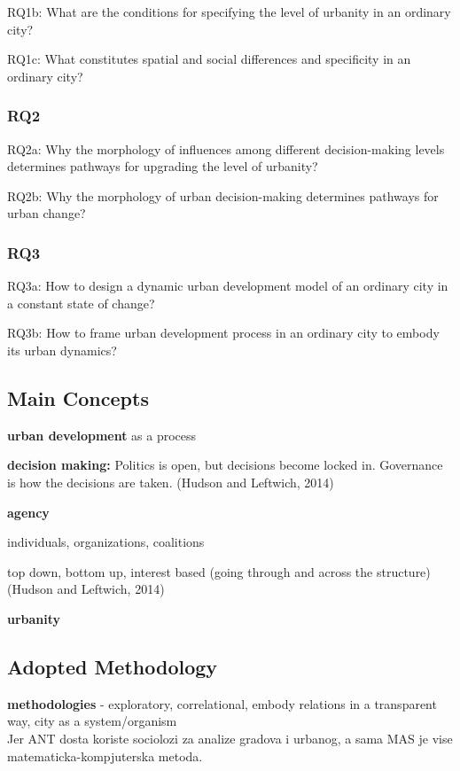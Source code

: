 \documentclass[11pt]{report}
\begin{document}
RQ1b: What are the conditions for specifying the level of urbanity in an ordinary city?

RQ1c: What constitutes spatial and social differences and specificity in an ordinary city?

\subsubsection{RQ2}

RQ2a: Why the morphology of influences among different decision-making levels determines pathways for upgrading the level of urbanity?

RQ2b: Why the morphology of urban decision-making determines pathways for urban change? 

\subsubsection{RQ3}

RQ3a: How to design a dynamic urban development model of an ordinary city in a constant state of change? 

RQ3b: How to frame urban development process in an ordinary city to embody its urban dynamics?

\subsection{Main Concepts}

\textbf{urban development} as a process

\textbf{decision making:}
Politics is open, but decisions become locked in. Governance is how the decisions are taken. (Hudson and Leftwich, 2014)

\textbf{agency}

individuals, organizations, coalitions

top down, bottom up, interest based (going through and across the structure) (Hudson and Leftwich, 2014)

\textbf{urbanity}

\subsection{Adopted Methodology}

\textbf{methodologies} - exploratory, correlational, embody relations in a transparent way, city as a system/organism
\\
Jer ANT dosta koriste sociolozi za analize gradova i urbanog, a sama MAS je vise matematicka-kompjuterska metoda. 
\end{document}
